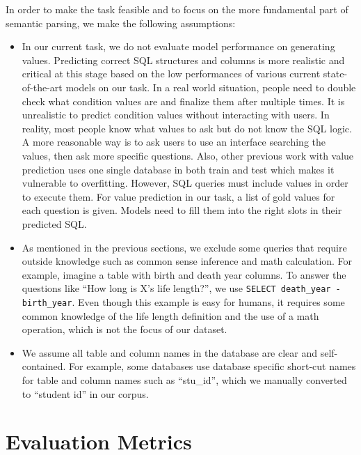 \documentclass[11pt,a4paper]{article}
\begin{document}
In order to make the task feasible and to focus on the more fundamental part of semantic parsing, we make the following assumptions:

\begin{itemize}
\setlength{\leftskip}{-3mm}
    \item In our current task, we do not evaluate model performance on generating values. Predicting correct SQL structures and columns is more realistic and critical at this stage based on the low performances of various current state-of-the-art models on our task. 
In a real world situation, people need to double check what condition values are and finalize them after multiple times. It is unrealistic to predict condition values without interacting with users. In reality, most people know what values to ask but do not know the SQL logic. A more reasonable way is to ask users to use an interface searching the values, then ask more specific questions. Also, other previous work with value prediction uses one single database in both train and test which makes it vulnerable to overfitting. However, SQL queries must include values in order to execute them. For value prediction in our task, a list of gold values for each question is given. Models need to fill them into the right slots in their predicted SQL.
    
    \item As mentioned in the previous sections, we exclude some queries that require outside knowledge such as common sense inference and math calculation. For example, imagine a table with birth and death year columns. To answer the questions like ``How long is X's life length?'', we use \texttt{SELECT death\_year - birth\_year}. Even though this example is easy for humans, it requires some common knowledge of the life length definition and the use of a math operation, which is not the focus of our dataset.


    \item We assume all table and column names in the database are clear and self-contained.
For example, some databases use database specific short-cut names for table and column names such as ``stu\_id'', which we manually converted to ``student id'' in our corpus.


\end{itemize}

\section{Evaluation Metrics}
\label{sec:eval}
\end{document}

